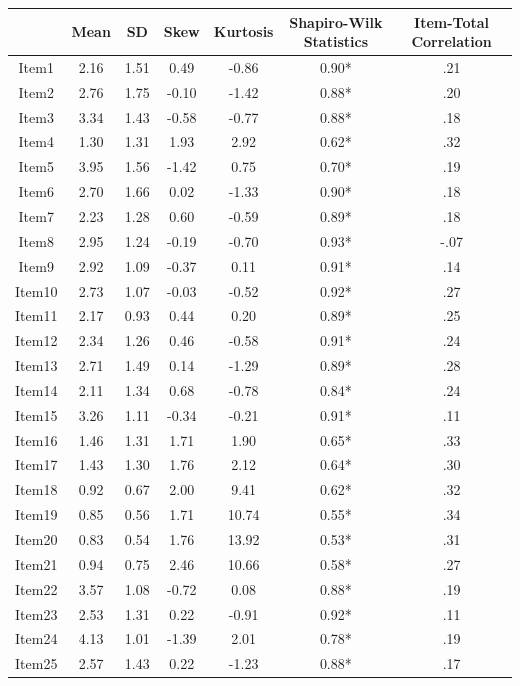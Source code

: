 \documentclass[
  english,
  man]{apa6}
\begin{document}
\begin{appendix}
\begin{table}[h]
\begin{center}
\begin{threeparttable}
\begin{tabular}{ccccccc}
\toprule
 & \multicolumn{1}{c}{Mean} & \multicolumn{1}{c}{SD} & \multicolumn{1}{c}{Skew} & \multicolumn{1}{c}{Kurtosis} & \multicolumn{1}{c}{Shapiro-Wilk Statistics} & \multicolumn{1}{c}{Item-Total Correlation}\\
\midrule
Item1 & 2.16 & 1.51 & 0.49 & -0.86 & 0.90* & .21\\
Item2 & 2.76 & 1.75 & -0.10 & -1.42 & 0.88* & .20\\
Item3 & 3.34 & 1.43 & -0.58 & -0.77 & 0.88* & .18\\
Item4 & 1.30 & 1.31 & 1.93 & 2.92 & 0.62* & .32\\
Item5 & 3.95 & 1.56 & -1.42 & 0.75 & 0.70* & .19\\
Item6 & 2.70 & 1.66 & 0.02 & -1.33 & 0.90* & .18\\
Item7 & 2.23 & 1.28 & 0.60 & -0.59 & 0.89* & .18\\
Item8 & 2.95 & 1.24 & -0.19 & -0.70 & 0.93* & -.07\\
Item9 & 2.92 & 1.09 & -0.37 & 0.11 & 0.91* & .14\\
Item10 & 2.73 & 1.07 & -0.03 & -0.52 & 0.92* & .27\\
Item11 & 2.17 & 0.93 & 0.44 & 0.20 & 0.89* & .25\\
Item12 & 2.34 & 1.26 & 0.46 & -0.58 & 0.91* & .24\\
Item13 & 2.71 & 1.49 & 0.14 & -1.29 & 0.89* & .28\\
Item14 & 2.11 & 1.34 & 0.68 & -0.78 & 0.84* & .24\\
Item15 & 3.26 & 1.11 & -0.34 & -0.21 & 0.91* & .11\\
Item16 & 1.46 & 1.31 & 1.71 & 1.90 & 0.65* & .33\\
Item17 & 1.43 & 1.30 & 1.76 & 2.12 & 0.64* & .30\\
Item18 & 0.92 & 0.67 & 2.00 & 9.41 & 0.62* & .32\\
Item19 & 0.85 & 0.56 & 1.71 & 10.74 & 0.55* & .34\\
Item20 & 0.83 & 0.54 & 1.76 & 13.92 & 0.53* & .31\\
Item21 & 0.94 & 0.75 & 2.46 & 10.66 & 0.58* & .27\\
Item22 & 3.57 & 1.08 & -0.72 & 0.08 & 0.88* & .19\\
Item23 & 2.53 & 1.31 & 0.22 & -0.91 & 0.92* & .11\\
Item24 & 4.13 & 1.01 & -1.39 & 2.01 & 0.78* & .19\\
Item25 & 2.57 & 1.43 & 0.22 & -1.23 & 0.88* & .17\\

\end{tabular}
\end{threeparttable}
\end{center}
\end{table}
\end{appendix}
\end{document}
